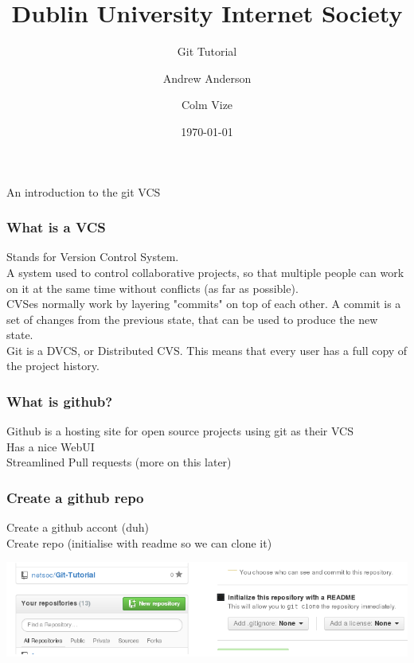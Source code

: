 \documentclass[xcolor=dvipsnames]{beamer}
\begin{document}
\title[Netsoc Git Tutorial] {Dublin University Internet Society}
\author[A. Anderson \& C. Vize]{Andrew Anderson  \and Colm Vize }
\subtitle{Git Tutorial}{An introduction to the git VCS}
\date{\today}
\titlepage

\begin{frame}
    \frametitle{What is a VCS}
    
    Stands for Version Control System.\\
    A system used to control collaborative projects, so that multiple people can work on it at the same
    time without conflicts (as far as possible).\\
    CVSes normally work by layering "commits" on top of each other. A commit is a set of changes from the previous state,
    that can be used to produce the new state.\\
    Git is a DVCS, or Distributed CVS. This means that every user has a full copy of the project history.\\
\end{frame}

\begin{frame}
    \frametitle{What is github?}

    Github is a hosting site for open source projects using git as their VCS\\
    Has a nice WebUI\\
    Streamlined Pull requests (more on this later)\\
\end{frame}

\begin{frame}
    \frametitle{Create a github repo}

    Create a github accont (duh)\\
    Create repo (initialise with readme so we can clone it)
    \begin{center}
        \includegraphics[scale=0.4]{gh-create-repo.png}
    \end{center}

\end{frame}
\end{document}
